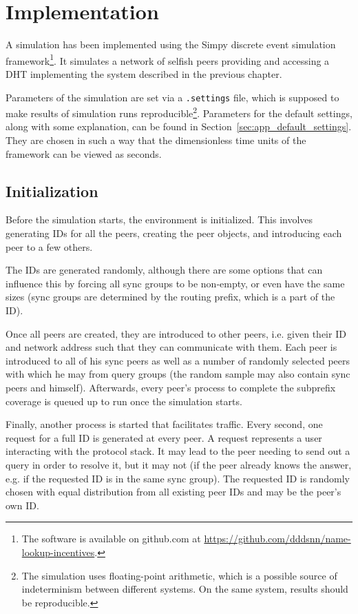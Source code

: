 \chapter{Implementation}
\label{chap:implementation}
A simulation has been implemented using the Simpy discrete event simulation
framework\footnote{The software is available on github.com at
\url{https://github.com/dddsnn/name-lookup-incentives}.}. It simulates a network
of selfish peers providing and accessing a DHT implementing the system described
in the previous chapter.

Parameters of the simulation are set via a \texttt{.settings} file, which is
supposed to make results of simulation runs reproducible\footnote{The simulation
uses floating-point arithmetic, which is a possible source of indeterminism
between different systems\cite{dawson2013determinism}. On the same system,
results should be reproducible.}. Parameters for the default settings, along
with some explanation, can be found in Section~\ref{sec:app_default_settings}.
They are chosen in such a way that the dimensionless time units of the
framework can be viewed as seconds.

\section{Initialization}
Before the simulation starts, the environment is initialized. This involves
generating IDs for all the peers, creating the peer objects, and introducing
each peer to a few others.

The IDs are generated randomly, although there are some options that can
influence this by forcing all sync groups to be non-empty, or even have the same
sizes (sync groups are determined by the routing prefix, which is a part of the
ID).

Once all peers are created, they are introduced to other peers, i.e. given their
ID and network address such that they can communicate with them. Each peer is
introduced to all of his sync peers as well as a number of randomly selected
peers with which he may from query groups (the random sample may also contain
sync peers and himself). Afterwards, every peer's process to complete the
subprefix coverage is queued up to run once the simulation starts.

Finally, another process is started that facilitates traffic. Every second, one
request for a full ID is generated at every peer. A request represents a user
interacting with the protocol stack. It may lead to the peer needing to send out
a query in order to resolve it, but it may not (if the peer already knows the
answer, e.g. if the requested ID is in the same sync group). The requested ID is
randomly chosen with equal distribution from all existing peer IDs and may be
the peer's own ID.

